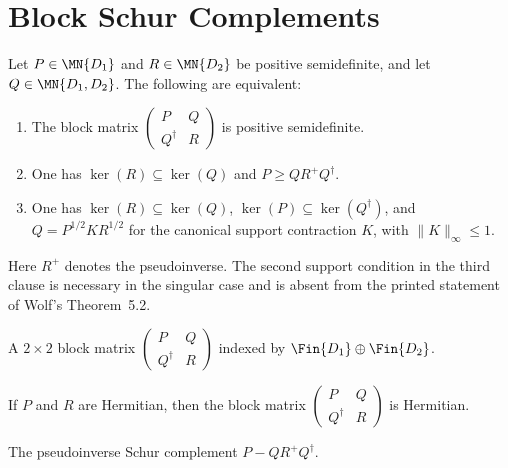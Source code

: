 \section{Block Schur Complements}\label{sec:schur_complement}

\begin{theorem}\label{thm:schur_tfae}
  \leanok
  Let $P \in \MN{D_1}$ and $R \in \MN{D_2}$ be positive semidefinite, and
  let $Q \in \MN{D_1,D_2}$. The following are equivalent:
  \begin{enumerate}
    \item The block matrix
      $\begin{pmatrix} P & Q \\ Q^\dagger & R \end{pmatrix}$ is positive
      semidefinite.
    \item One has $\ker(R)\subseteq\ker(Q)$ and
      $P\geq QR^+Q^\dagger$.
    \item One has $\ker(R)\subseteq\ker(Q)$,
      $\ker(P)\subseteq\ker(Q^\dagger)$, and
      $Q=P^{1/2}KR^{1/2}$ for the canonical support contraction $K$, with
      $\lVert K\rVert_\infty\leq1$.
  \end{enumerate}
  Here $R^+$ denotes the pseudoinverse. The second support condition in the
  third clause is necessary in the singular case and is absent from the
  printed statement of Wolf's Theorem~5.2.
\end{theorem}

\begin{definition}\label{def:blockMatrix}
  \leanok
  A $2 \times 2$ block matrix $\begin{pmatrix} P & Q \\ Q^\dagger & R \end{pmatrix}$
  indexed by $\Fin{D_1} \oplus \Fin{D_2}$.
\end{definition}

\begin{lemma}\label{lem:blockMatrix_isHermitian}
  \leanok
  If $P$ and $R$ are Hermitian, then the block matrix
  $\begin{pmatrix} P & Q \\ Q^\dagger & R \end{pmatrix}$ is Hermitian.
\end{lemma}

\begin{definition}\label{def:schurComplement}
  \leanok
  The pseudoinverse Schur complement $P - Q R^+ Q^\dagger$.
\end{definition}
